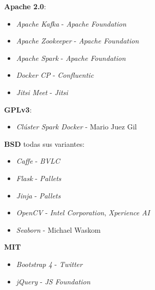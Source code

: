 \textbf{Apache 2.0}:
\begin{itemize}
	\item \textit{Apache Kafka} - \textit{Apache Foundation}
	\item \textit{Apache Zookeeper} - \textit{Apache Foundation}
	\item \textit{Apache Spark} - \textit{Apache Foundation}
	\item \textit{Docker CP} - \textit{Confluentic}
	\item \textit{Jitsi Meet} - \textit{Jitsi}
\end{itemize}

\textbf{GPLv3}:
\begin{itemize}
	\item \textit{Clúster Spark Docker} - Mario Juez Gil
\end{itemize}

\textbf{BSD} todas sus variantes:
\begin{itemize}
	\item \textit{Caffe} - \textit{BVLC}
	\item \textit{Flask} - \textit{Pallets}
	\item \textit{Jinja} - \textit{Pallets}
	\item \textit{OpenCV} - \textit{Intel Corporation}, \textit{Xperience AI}
	\item \textit{Seaborn} - Michael Waskom
\end{itemize}

\textbf{MIT}
\begin{itemize}
	\item \textit{Bootstrap 4} - \textit{Twitter}
	\item \textit{jQuery} - \textit{JS Foundation}
\end{itemize}

